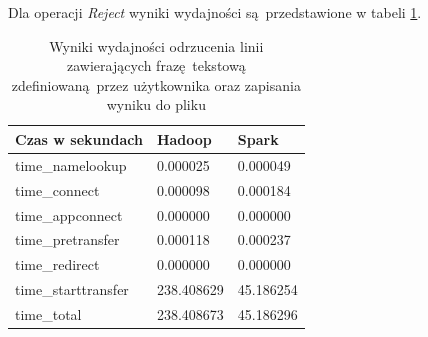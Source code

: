 Dla operacji \textit{Reject} wyniki wydajności są przedstawione w tabeli \ref{tab:reject-results}.
\begin{table}[]
	\centering
	\caption{Wyniki wydajności odrzucenia linii zawierających frazę tekstową zdefiniowaną przez użytkownika oraz zapisania wyniku do pliku}
	\label{tab:reject-results}
	\begin{tabular}{|l|l|l|}
		\hline
		Czas w sekundach    & Hadoop     & Spark     \\ \hline
		time\_namelookup    & 0.000025   & 0.000049  \\ \hline
		time\_connect       & 0.000098   & 0.000184  \\ \hline
		time\_appconnect    & 0.000000   & 0.000000  \\ \hline
		time\_pretransfer   & 0.000118   & 0.000237  \\ \hline
		time\_redirect      & 0.000000   & 0.000000  \\ \hline
		time\_starttransfer & 238.408629 & 45.186254 \\ \hline
		time\_total         & 238.408673 & 45.186296 \\ \hline
	\end{tabular}
\end{table}
